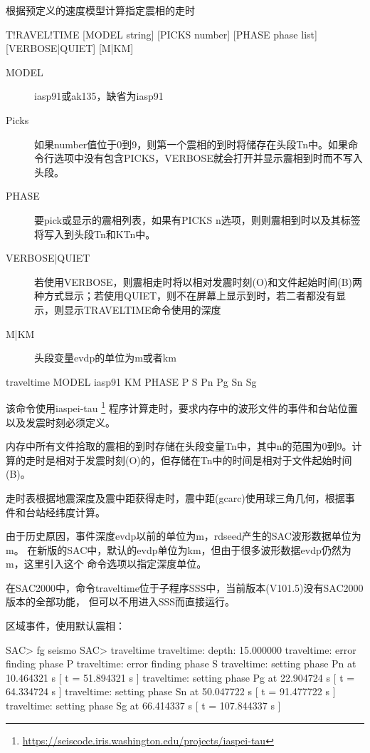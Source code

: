\label{cmd:traveltime}

根据预定义的速度模型计算指定震相的走时

\begin{SACSTX}
T!RAVEL!TIME [MODEL string] [PICKS number] [PHASE phase list]
    [VERBOSE|QUIET] [M|KM]
\end{SACSTX}

\begin{description}
\item [MODEL] iasp91或ak135，缺省为iasp91
\item [Picks] 如果number值位于0到9，则第一个震相的到时将储存在头段Tn中。如果命令行选项中没有包含PICKS，VERBOSE就会打开并显示震相到时而不写入头段。
\item [PHASE] 要pick或显示的震相列表，如果有PICKS n选项，则则震相到时以及其标签将写入到头段Tn和KTn中。
\item [VERBOSE|QUIET] 若使用VERBOSE，则震相走时将以相对发震时刻(O)和文件起始时间(B)两种方式显示；若使用QUIET，则不在屏幕上显示到时，若二者都没有显示，则显示TRAVELTIME命令使用的深度
\item [M|KM] 头段变量evdp的单位为m或者km
\end{description}

\begin{SACDFT}
traveltime MODEL iasp91 KM PHASE P S Pn Pg Sn Sg
\end{SACDFT}

该命令使用iaspei-tau
\footnote{\url{https://seiscode.iris.washington.edu/projects/iaspei-tau}}
程序计算走时，要求内存中的波形文件的事件和台站位置以及发震时刻必须定义。

内存中所有文件拾取的震相的到时存储在头段变量Tn中，其中n的范围为0到9。计算的走时是相对于发震时刻(O)的，但存储在Tn中的时间是相对于文件起始时间(B)。

走时表根据地震深度及震中距获得走时，震中距(gcarc)使用球三角几何，根据事件和台站经纬度计算。

由于历史原因，事件深度evdp以前的单位为m，rdseed产生的SAC波形数据单位为m。
在新版的SAC中，默认的evdp单位为km，但由于很多波形数据evdp仍然为m，这里引入这个
命令选项以指定深度单位。

在SAC2000中，命令traveltime位于子程序SSS中，当前版本(V101.5)没有SAC2000版本的全部功能，
但可以不用进入SSS而直接运行。

区域事件，使用默认震相：
\begin{SACCode}
SAC> fg seismo
SAC> traveltime
traveltime: depth: 15.000000
traveltime: error finding phase P
traveltime: error finding phase S
traveltime: setting phase Pn       at 10.464321 s [ t = 51.894321 s ]
traveltime: setting phase Pg       at 22.904724 s [ t = 64.334724 s ]
traveltime: setting phase Sn       at 50.047722 s [ t = 91.477722 s ]
traveltime: setting phase Sg      at 66.414337 s [ t = 107.844337 s ]
\end{SACCode}

